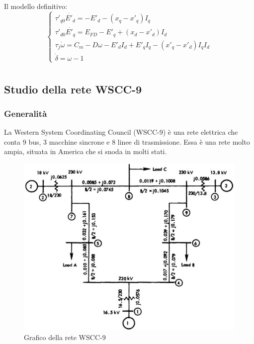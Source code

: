\documentclass[Lau,noexaminfo]{sapthesis}
\begin{document}
	Il modello definitivo:\\
	\[
	\begin{cases}
	\tau'_{q0} \dot{E'_d}=-E'_d-(x_q-x'_q)I_q\\
	\tau'_{d0}\dot{E'_q}=E_{FD}-E'_q+(x_d-x'_d)I_d\\
	\tau_j\dot{\omega}=C_m-D\omega-E'_dI_d+E'_qI_q-(x'_q-x'_d)I_qI_d\\
	\dot{\delta}=\omega-1
	\end{cases}
	\]
	\chapter{}
	\section{Studio della rete WSCC-9}
	\subsection{Generalità}
	La Western System Coordinating Council (WSCC-9) è una rete elettrica che conta 9 bus, 3 macchine sincrone e 8 linee di trasmissione. Essa è una rete molto ampia, situata in America che si snoda in molti stati.
	\begin{figure}
		\centering
		\includegraphics[height=0.5\textheight]{WSCC_line}
		\caption{Grafico della rete WSCC-9}
	\end{figure}
\end{document}
